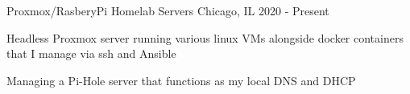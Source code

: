 

\begin{cventries}

  \cventry
    {Proxmox/RasberyPi} %
    {Homelab Servers} %
    {Chicago, IL} %
    {2020 - Present} %
    {
      \begin{cvitems} %
        \item {Headless Proxmox server running various linux VMs alongside docker containers that I manage via ssh and Ansible}
        \item {Managing a Pi-Hole server that functions as my local DNS and DHCP}
      \end{cvitems}
    }

\end{cventries}
